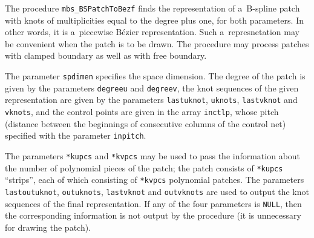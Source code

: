 \vspace{\bigskipamount}
\begin{sloppypar}
The procedure \texttt{mbs\_BSPatchToBezf} finds the representation of
a~B-spline patch with knots of multiplicities equal to the degree plus one,
for both parameters. In other words, it is a~piecewise B\'{e}zier representation.
Such a~represnetation may be convenient when the patch is to be drawn.
The procedure may process patches with clamped boundary as well as with
free boundary.
\end{sloppypar}

The parameter \texttt{spdimen} specifies the space dimension.
The degree of the patch is given by the parameters
\texttt{degreeu} and \texttt{degreev}, the knot sequences of the given
representation are given by the parameters
\texttt{lastuknot}, \texttt{uknots}, \texttt{lastvknot} and \texttt{vknots},
and the control points are given in the array \texttt{inctlp}, whose pitch
(distance between the beginnings of consecutive columns of the control net)
specified with the parameter \texttt{inpitch}.

\begin{sloppypar}
The parameters \texttt{*kupcs} and \texttt{*kvpcs} may be used to pass
the information about the number of polynomial pieces of the patch;
the patch consists of \texttt{*kupcs} ``strips'', each of which consisting
of \texttt{*kvpcs} polynomial patches. The parameters \texttt{lastoutuknot},
\texttt{outuknots}, \texttt{lastvknot} and \texttt{outvknots} are used to
output the knot sequences of the final representation. If any of the four
parameters is \texttt{NULL}, then the corresponding information is not
output by the procedure (it is unnecessary for drawing the patch).%
\end{sloppypar}

